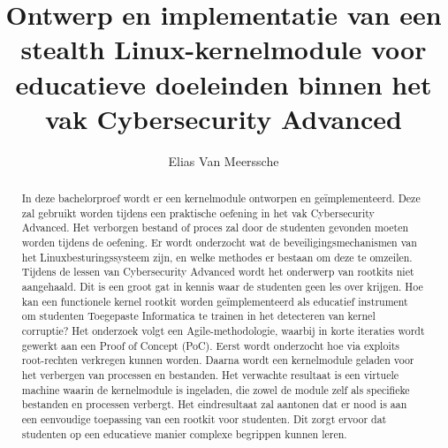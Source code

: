 \documentclass{hogent-article}
\title{Ontwerp en implementatie van een stealth Linux-kernelmodule voor educatieve doeleinden binnen het vak Cybersecurity Advanced}
\author{Elias Van Meerssche}
\begin{document}
\begin{abstract}
In deze bachelorproef wordt er een kernelmodule ontworpen en geïmplementeerd. Deze zal gebruikt worden tijdens een praktische oefening in het vak Cybersecurity Advanced. Het verborgen bestand of proces zal door de studenten gevonden moeten worden tijdens de oefening.
Er wordt onderzocht wat de beveiligingsmechanismen van het Linuxbesturingssysteem zijn, en welke methodes er bestaan om deze te omzeilen. Tijdens de lessen van Cybersecurity Advanced wordt het onderwerp van rootkits niet aangehaald. Dit is een groot gat in kennis waar de studenten geen les over krijgen. Hoe kan een functionele kernel rootkit worden geïmplementeerd als educatief instrument om studenten Toegepaste Informatica te trainen in het detecteren van kernel corruptie?
Het onderzoek volgt een Agile-methodologie, waarbij in korte iteraties wordt gewerkt aan een Proof of Concept (PoC). Eerst wordt onderzocht hoe via exploits root-rechten verkregen kunnen worden. Daarna wordt een kernelmodule geladen voor het verbergen van processen en bestanden. Het verwachte resultaat is een virtuele machine waarin de kernelmodule is ingeladen, die zowel de module zelf als specifieke bestanden en processen verbergt.
Het eindresultaat zal aantonen dat er nood is aan een eenvoudige toepassing van een rootkit voor studenten. Dit zorgt ervoor dat studenten op een educatieve manier complexe begrippen kunnen leren.


\end{abstract}

\tableofcontents



\printbibliography[heading=bibintoc]
\end{document}
